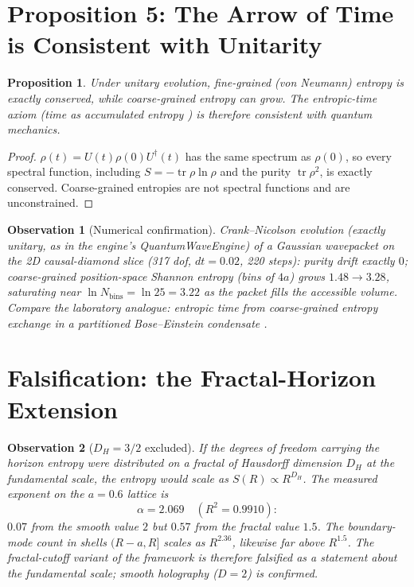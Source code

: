 \documentclass[11pt,a4paper]{article}
\newtheorem{proposition}{Proposition}
\newtheorem{observation}{Observation}
\theoremstyle{definition}
\theoremstyle{remark}
\begin{document}
\section{Proposition 5: The Arrow of Time is Consistent with Unitarity}
\label{prop:arrow}

\begin{proposition}
Under unitary evolution, fine-grained (von Neumann) entropy is exactly
conserved, while coarse-grained entropy can grow. The entropic-time axiom
(time as accumulated entropy \cite{OGHoTT,Barontini2025}) is therefore
consistent with quantum mechanics.
\end{proposition}

\begin{proof}
$\rho(t) = U(t)\rho(0)U^\dagger(t)$ has the same spectrum as $\rho(0)$, so
every spectral function, including $S = -\operatorname{tr}\rho\ln\rho$ and the
purity $\operatorname{tr}\rho^2$, is exactly conserved. Coarse-grained
entropies are not spectral functions and are unconstrained.
\end{proof}

\begin{observation}[Numerical confirmation]
Crank--Nicolson evolution (exactly unitary, as in the engine's
QuantumWaveEngine) of a Gaussian wavepacket on the 2D causal-diamond slice
(317 dof, $dt = 0.02$, 220 steps): purity drift exactly $0$; coarse-grained
position-space Shannon entropy (bins of $4a$) grows $1.48 \to 3.28$,
saturating near $\ln N_{\mathrm{bins}} = \ln 25 = 3.22$ as the packet fills
the accessible volume. Compare the laboratory analogue: entropic time from
coarse-grained entropy exchange in a partitioned Bose--Einstein condensate
\cite{Barontini2025}.
\end{observation}

\section{Falsification: the Fractal-Horizon Extension}
\label{sec:falsify}

\begin{observation}[$D_H = 3/2$ excluded]
If the degrees of freedom carrying the horizon entropy were distributed on a
fractal of Hausdorff dimension $D_H$ at the fundamental scale, the entropy
would scale as $S(R) \propto R^{D_H}$. The measured exponent on the
$a = 0.6$ lattice is
\[
\alpha = 2.069 \quad (R^2 = 0.9910):
\]
$0.07$ from the smooth value $2$ but $0.57$ from the fractal value $1.5$.
The boundary-mode count in shells $(R-a, R]$ scales as $R^{2.36}$, likewise
far above $R^{1.5}$. The fractal-cutoff variant of the framework
\cite{OGBackreaction} is therefore falsified as a statement about the
fundamental scale; smooth holography ($D = 2$) is confirmed.
\end{observation}
\end{document}
